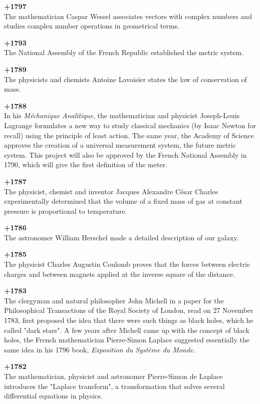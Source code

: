 \textbf{+1797}\\
The mathematician Caspar Wessel associates vectors with complex numbers and studies complex number operations in geometrical terms.

\textbf{+1793}\\
The National Assembly of the French Republic established the metric system.

\textbf{+1789}\\
The physicists and chemists Antoine Lavoisier states the law of conservation of mass.

\textbf{+1788}\\
In his \textit{Méchanique Analitique}, the mathematician and physicist Joseph-Louis Lagrange formulates a new way to study classical mechanics (by Isaac Newton for recall) using the principle of least action. The same year, the Academy of Science approves the creation of a universal measurement system, the future metric system. This project will also be approved by the French National Assembly in 1790, which will give the first definition of the meter.

\textbf{+1787}\\
The physicist, chemist and inventor Jacques Alexandre César Charles experimentally determined that the volume of a fixed mass of gas at constant pressure is proportional to temperature.

\textbf{+1786}\\
The astronomer William Herschel made a detailed description of our galaxy.

\textbf{+1785}\\
The physicist Charles Augustin Coulomb proves that the forces between electric charges and between magnets applied at the inverse square of the distance.

\textbf{+1783}\\
The clergyman and natural philosopher John Michell in a paper for the Philosophical Transactions of the Royal Society of London, read on 27 November 1783, first proposed the idea that there were such things as black holes, which he called "dark stars". A few years after Michell came up with the concept of black holes, the French mathematician Pierre-Simon Laplace suggested essentially the same idea in his 1796 book, \textit{Exposition du Système du Monde}. 

\textbf{+1782}\\
The mathematician, physicist and astronomer Pierre-Simon de Laplace introduces the "Laplace transform", a transformation that solves several differential equations in physics.

